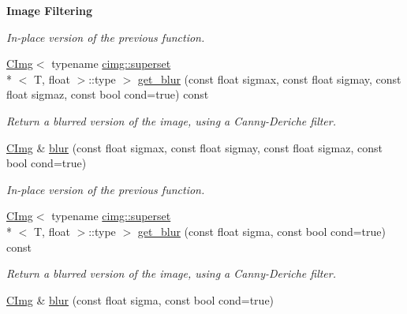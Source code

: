 \begin{Indent}{\bf Image Filtering}
\begin{DoxyCompactItemize}
\begin{DoxyCompactList}\small\item\em In-\/place version of the previous function. \end{DoxyCompactList}\item 
\hyperlink{structcimg__library_1_1_c_img}{C\-Img}$<$ typename \hyperlink{structcimg__library_1_1cimg_1_1superset}{cimg\-::superset}\\*
$<$ T, float $>$\-::type $>$ \hyperlink{structcimg__library_1_1_c_img_ad5de3e55741aaa3d81b93a1c843f434d}{get\-\_\-blur} (const float sigmax, const float sigmay, const float sigmaz, const bool cond=true) const 
\begin{DoxyCompactList}\small\item\em Return a blurred version of the image, using a Canny-\/\-Deriche filter. \end{DoxyCompactList}\item 
\hypertarget{structcimg__library_1_1_c_img_aa3bee0969192e89e9eb979c0fcb97861}{\hyperlink{structcimg__library_1_1_c_img}{C\-Img} \& \hyperlink{structcimg__library_1_1_c_img_aa3bee0969192e89e9eb979c0fcb97861}{blur} (const float sigmax, const float sigmay, const float sigmaz, const bool cond=true)}\label{structcimg__library_1_1_c_img_aa3bee0969192e89e9eb979c0fcb97861}

\begin{DoxyCompactList}\small\item\em In-\/place version of the previous function. \end{DoxyCompactList}\item 
\hypertarget{structcimg__library_1_1_c_img_ae9d2900c0666e1bdfe2b80e9c91f3d2f}{\hyperlink{structcimg__library_1_1_c_img}{C\-Img}$<$ typename \hyperlink{structcimg__library_1_1cimg_1_1superset}{cimg\-::superset}\\*
$<$ T, float $>$\-::type $>$ \hyperlink{structcimg__library_1_1_c_img_ae9d2900c0666e1bdfe2b80e9c91f3d2f}{get\-\_\-blur} (const float sigma, const bool cond=true) const }\label{structcimg__library_1_1_c_img_ae9d2900c0666e1bdfe2b80e9c91f3d2f}

\begin{DoxyCompactList}\small\item\em Return a blurred version of the image, using a Canny-\/\-Deriche filter. \end{DoxyCompactList}\item 
\hypertarget{structcimg__library_1_1_c_img_ac6e679a93021daf5daba41d146b76ada}{\hyperlink{structcimg__library_1_1_c_img}{C\-Img} \& \hyperlink{structcimg__library_1_1_c_img_ac6e679a93021daf5daba41d146b76ada}{blur} (const float sigma, const bool cond=true)}\label{structcimg__library_1_1_c_img_ac6e679a93021daf5daba41d146b76ada}


\end{DoxyCompactItemize}
\end{Indent}
